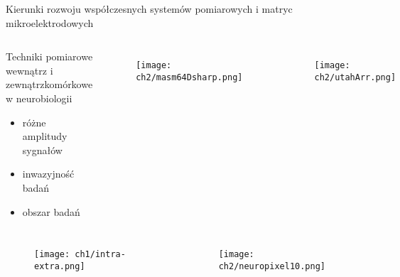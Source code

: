 

\begin{frame}{Kierunki rozwoju współczesnych systemów pomiarowych i matryc mikroelektrodowych}
   
    \begin{columns}

    \begin{block}{Techniki pomiarowe wewnątrz i \\
        zewnątrzkomórkowe w neurobiologii}
        \begin{itemize}
            \item różne amplitudy sygnałów
            \item inwazyjność badań
            \item obszar badań 
        \end{itemize}
    \end{block}
    \vspace{-3em} %

        \begin{columns}
        \begin{figure}[H]
            \texttt{[image: ch2/masm64Dsharp.png]}
        \end{figure}

            \begin{figure}[H]
                \texttt{[image: ch2/utahArr.png]}
            \end{figure}
        \end{columns}
    \end{columns}

    \begin{columns}


        \begin{figure}[H]
            \texttt{[image: ch1/intra-extra.png]}  
        \end{figure}

        \vspace{-2em} %
        \begin{figure}[H]
            \texttt{[image: ch2/neuropixel10.png]}  
        \end{figure}


    \end{columns}


    
\end{frame}

